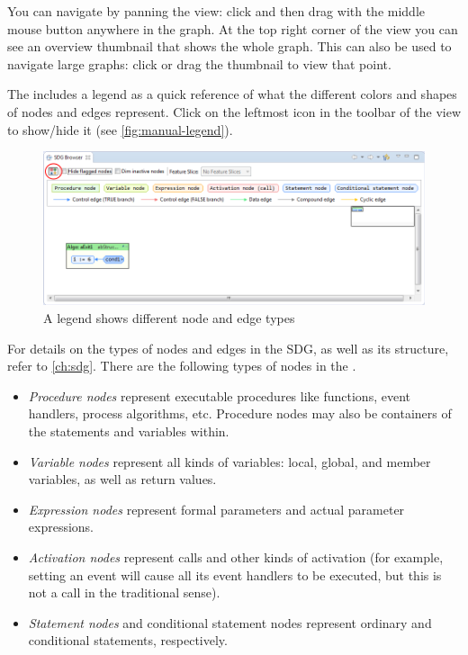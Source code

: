 You can navigate by panning the view: click and then drag with the middle mouse button anywhere in the graph. At the 
top right corner of the \SB view you can see an overview thumbnail that shows the whole graph. This can also be used to 
navigate large graphs: click or drag the thumbnail to view that point.

The \SB includes a legend as a quick reference of what the different colors and shapes of nodes and edges represent. 
Click on the leftmost icon in the toolbar of the \SB view to show/hide it (see \autoref{fig:manual-legend}).

\begin{figure}[hp]
  \centering
    \includegraphics[width=\textwidth]{bilder/manual-legend}
  \caption{A legend shows different node and edge types}
  \label{fig:manual-legend}
\end{figure}

For details on the types of nodes and edges in the SDG, as well as its structure, refer to \autoref{ch:sdg}. There are 
the following types of nodes in the \SB.

\begin{itemize}
  \item \emph{Procedure nodes} represent executable procedures like functions, event handlers, process algorithms, etc. 
  Procedure nodes may also be containers of the statements and variables within.
  
  \item \emph{Variable nodes} represent all kinds of variables: local, global, and member variables, as well as return 
  values.
  
  \item \emph{Expression nodes} represent formal parameters and actual parameter expressions.
  
  \item \emph{Activation nodes} represent calls and other kinds of activation (for example, setting an event will cause 
  all its event handlers to be executed, but this is not a call in the traditional sense).
  
  \item \emph{Statement nodes} and conditional statement nodes represent ordinary and conditional statements, 
  respectively.
\end{itemize}

